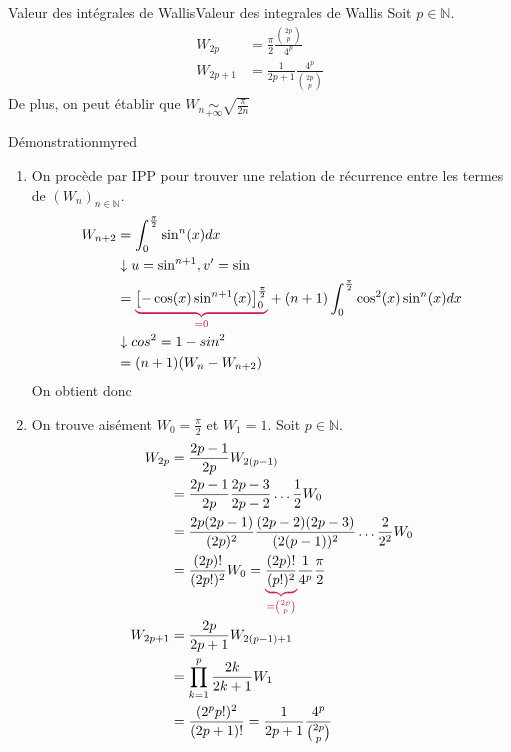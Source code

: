     \begin{theo}{Valeur des intégrales de Wallis}{Valeur des integrales de Wallis}
        Soit $p \in \mathbb{N}$.
        \begin{align*}
            W_{2p}&= \frac{\pi}{2} \frac{\binom{2p}{p}}{4^p} \\
            W_{2p+1}&= \frac{1}{2p + 1} \frac{4^p}{\binom{2p}{p}}
        \end{align*}
        De plus, on peut établir que $W_n \underset{+\infty}{\sim} \sqrt{\frac{\pi}{2n}}$
    \end{theo}

    \begin{omed}{Démonstration}{myred}
    \begin{enumerate}
    \item On procède par \textsc{\color{myred} IPP} pour trouver une relation de récurrence entre les termes de $(W_n)_{n \in \mathbb{N}}$.
    \begin{align*}
        W_{n+2} &= \int_{0}^{\frac{\pi}{2}} \sin^n(x)dx \\
        & \downarrow u=\sin^{n+1}, v' = \sin \\
        &= {\color{myred}\underbrace{{\color{black}\left[ - \cos(x)\sin^{n+1}(x) \right]_0^{\frac{\pi}{2}}}}_{= 0}} + (n+1) \int_{0}^{\frac{\pi}{2}} \cos^2(x) \sin^n(x)dx \\
        &\downarrow cos^2 = 1 - sin^2 \\
        &= (n+1)(W_n - W_{n+2})
    \end{align*}
    On obtient donc 

    \item On trouve aisément $W_0 = \frac{\pi}{2}$ et $W_1 = 1$. Soit $p \in \mathbb{N}$. 
    \begin{align*}
        W_{2p} &= \frac{2p-1}{2p} W_{2(p-1)} \\
        &= \frac{2p-1}{2p} \frac{2p-3}{2p-2} \ldots \frac{1}{2} W_0 \\
        &= \frac{2p (2p-1)}{(2p)^2} \frac{(2p-2)(2p-3)}{(2(p-1))^2} \ldots \frac{2}{2^2} W_0 \\
        &= \frac{(2p)!}{(2p!)^2} W_0 = {\color{myred}\underbrace{{\color{black}\frac{(2p)!}{(p!)^2}}}_{= \binom{2p}{p}}} \frac{1}{4^p} \frac{\pi}{2} \\
        W_{2p+1} &= \frac{2p}{2p+1} W_{2(p-1)+1} \\
        &= \prod\limits_{k=1}^p \frac{2k}{2k+1} W_1 \\
        &= \frac{(2^p p!)^2}{(2p+1)!} = \frac{1}{2p+1} \frac{4^p}{\binom{2p}{p}}
    \end{align*}


\end{enumerate}
\end{omed}
